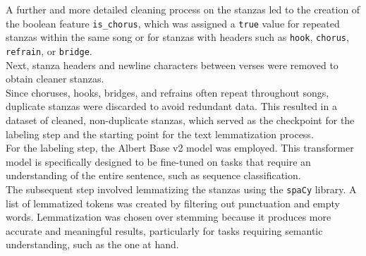A further and more detailed cleaning process on the stanzas led to the creation
of the boolean feature \texttt{is\_chorus}, which was assigned a \texttt{true}
value for repeated stanzas within the same song or for stanzas with headers such
as \texttt{hook}, \texttt{chorus}, \texttt{refrain}, or \texttt{bridge}.\\

Next, stanza headers and newline characters between verses were removed to obtain
cleaner stanzas.\\

Since choruses, hooks, bridges, and refrains often repeat throughout songs,
duplicate stanzas were discarded to avoid redundant data. This resulted in a
dataset of cleaned, non-duplicate stanzas, which served as the checkpoint for
the labeling step and the starting point for the text lemmatization process.\\

For the labeling step, the Albert Base v2 model was employed. This
transformer model is specifically designed to be fine-tuned on tasks that
require an understanding of the entire sentence, such as sequence classification.\\

The subsequent step involved lemmatizing the stanzas using the \texttt{spaCy}
library. A list of lemmatized tokens was created by filtering out punctuation
and empty words. Lemmatization was chosen over stemming because it produces
more accurate and meaningful results, particularly for tasks requiring semantic
understanding, such as the one at hand.\\
